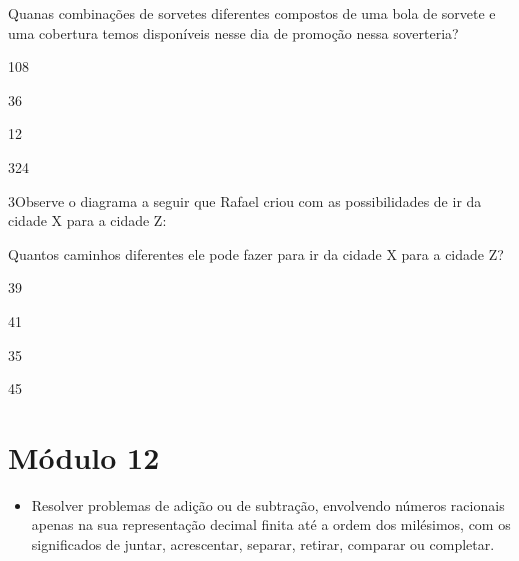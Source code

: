 {Quanas combinações de sorvetes diferentes compostos de uma bola de
sorvete e uma cobertura temos disponíveis nesse dia de promoção nessa
soverteria?

\begin{escolha}
\item
  108
\item
  36
\item
  12
\item
  324
\end{escolha}



\num{3}Observe o diagrama a seguir que Rafael criou com as possibilidades
de ir da cidade X para a cidade Z:

%

Quantos caminhos diferentes ele pode fazer para ir da cidade X para a
cidade Z?

\begin{escolha}
\item
  39
\item
  41
\item
  35
\item
  45
\end{escolha}



\chapter{Módulo 12}



\begin{itemize}
\item Resolver problemas de adição ou de subtração, envolvendo números
racionais apenas na sua representação decimal finita até a ordem dos
milésimos, com os significados de juntar, acrescentar, separar, retirar,
comparar ou completar.


\end{itemize}}
